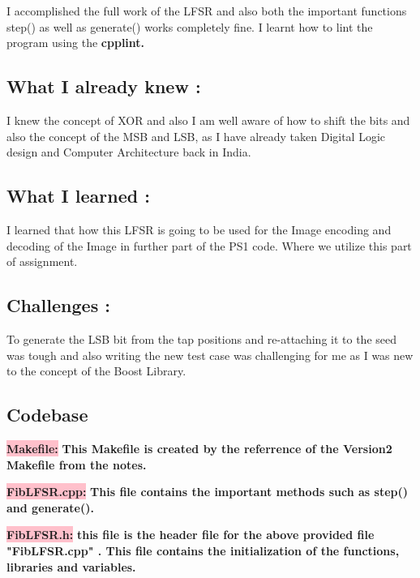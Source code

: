 I accomplished the full work of the LFSR and also both the important functions step() as well as generate() works completely fine. I learnt how to lint the program using the \textbf{cpplint.}

\subsection{What I already knew :}\label{sec:ps1a:knew}
 
I knew the concept of XOR and also I am well aware of how to shift the bits and also the concept of the MSB and LSB, as I have already taken Digital Logic design and Computer Architecture back in India.

\subsection{What I learned :}\label{sec:ps1a:learn}

I learned that how this LFSR is going to be used for the Image encoding and decoding of the Image in further part of the PS1 code. Where we utilize this part of assignment.

\subsection{Challenges :}\label{sec:ps1a:challenges}

To generate the LSB bit from the tap positions and re-attaching it to the seed was tough and also writing the new test case was challenging for me as I was new to the concept of the Boost Library.
\newpage

\subsection{Codebase}\label{sec:ps1a:code}

\colorbox{pink}{\textbf{Makefile:}} \newline \textbf{This Makefile is created by the referrence of the Version2 Makefile from the notes.}



\colorbox{pink}{\textbf{FibLFSR.cpp:}} \newline \textbf{This file contains the important methods such as step() and generate().}



\colorbox{pink}{\textbf{FibLFSR.h:}} \newline \textbf{this file is the header file for the above provided file "FibLFSR.cpp" . This file contains the initialization of the functions, libraries and variables.}

